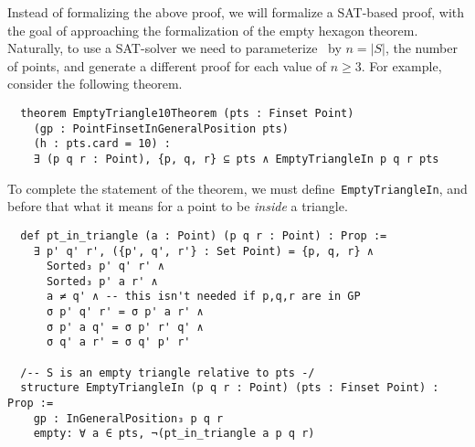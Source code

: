 Instead of formalizing the above proof, we will formalize a SAT-based proof, with the goal of approaching the formalization of the empty hexagon theorem.
Naturally, to use a  SAT-solver we need to parameterize~ by $n = |S|$, the number of points, and generate a different proof for each value of $n \geq 3$. For example, consider the following theorem.

\begin{lstlisting}
  theorem EmptyTriangle10Theorem (pts : Finset Point)
    (gp : PointFinsetInGeneralPosition pts)
    (h : pts.card = 10) :
    ∃ (p q r : Point), {p, q, r} ⊆ pts ∧ EmptyTriangleIn p q r pts
\end{lstlisting}

To complete the statement of the theorem, we must define~\texttt{EmptyTriangleIn}, and before that what it means for a point to be \emph{inside} a triangle.

\begin{lstlisting}
  def pt_in_triangle (a : Point) (p q r : Point) : Prop :=
    ∃ p' q' r', ({p', q', r'} : Set Point) = {p, q, r} ∧
      Sorted₃ p' q' r' ∧
      Sorted₃ p' a r' ∧
      a ≠ q' ∧ -- this isn't needed if p,q,r are in GP
      σ p' q' r' = σ p' a r' ∧
      σ p' a q' = σ p' r' q' ∧
      σ q' a r' = σ q' p' r'
  
  /-- S is an empty triangle relative to pts -/
  structure EmptyTriangleIn (p q r : Point) (pts : Finset Point) : Prop :=
    gp : InGeneralPosition₃ p q r
    empty: ∀ a ∈ pts, ¬(pt_in_triangle a p q r)
\end{lstlisting}


